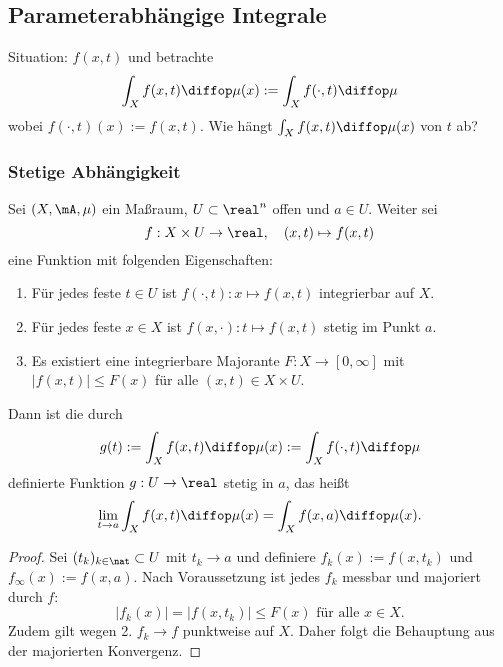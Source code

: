 \subsection{Parameterabhängige Integrale}
Situation: $f(x,t)$ und betrachte
\[ \int_X f(x,t) \diffop \mu(x) := \int_X f( \cdot, t ) \diffop \mu \]
wobei $f( \cdot, t)(x) := f(x,t)$. Wie hängt $\int_X f(x,t) \diffop \mu(x)$ von $t$ ab?

\subsubsection{Stetige Abhängigkeit}
\begin{thm}
 Sei $(X, \mA, \mu)$ ein Maßraum, $U \subset \real^n$ offen und $a \in U$. Weiter sei
 \[ f: X \times U \to \real, \quad (x,t) \mapsto f(x,t) \]
 eine Funktion mit folgenden Eigenschaften:
 \begin{enumerate}
  \item Für jedes feste $t \in U$ ist $f( \cdot, t ): x \mapsto f(x,t)$ integrierbar auf $X$.
  \item Für jedes feste $x \in X$ ist $f( x, \cdot ): t \mapsto f(x,t)$ stetig im Punkt $a$.
  \item Es existiert eine integrierbare Majorante $F: X \to [0,\infty]$ mit $|f(x,t)| \le F(x)$ für alle $(x,t) \in X \times U$.
 \end{enumerate}
 Dann ist die durch
 \[ g(t) := \int_X f(x,t) \diffop \mu(x) := \int_X f( \cdot, t ) \diffop \mu \]
 definierte Funktion $g: U \to \real$ stetig in $a$, das heißt
 \[ \lim_{t \to a} \int_X f(x,t) \diffop \mu(x) = \int_X f(x,a) \diffop \mu(x). \]
\end{thm}

\begin{proof}
 Sei $(t_k)_{k \in \nat} \subset U$ mit $t_k \to a$ und definiere $f_k(x) := f(x, t_k)$ und $f_\infty(x) := f(x, a)$. Nach Voraussetzung ist jedes $f_k$ messbar und majoriert durch $f$:
 \[ |f_k(x)| = |f(x,t_k)| \le F(x) \text{ für alle } x \in X. \]
 Zudem gilt wegen 2. $f_k \to f$ punktweise auf $X$. Daher folgt die Behauptung aus der majorierten Konvergenz.
\end{proof}

